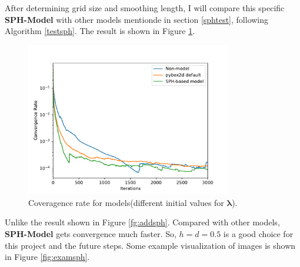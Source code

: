     After determining grid size and smoothing length, I will compare this specific \textbf{SPH-Model} with other models mentionde in section \ref{sphtest}, following Algorithm \ref{testsph}. The result is shown in Figure \ref{fig:final_test}.
     \begin{figure}[!ht]
        \centering
        \includegraphics[width=0.8\textwidth]{Figures/final_SPH.pdf}
        \caption{Coveragence rate for models(different initial values for $\pmb{\lambda}$).}
        \label{fig:final_test}
    \end{figure}
    Unlike the result shown in Figure \ref{fg:addsph}. Compared with other models, \textbf{SPH-Model} gets convergence much faster. So, $h=d=0.5$ is a good choice for this project and the future steps. Some example visualization of images is shown in Figure \ref{fig:examsph}.  
